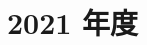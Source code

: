 \documentclass[../../hsm_tok_a.tex]{subfiles}
\begin{document}
    \section{2021 年度}

    

    \clearpage

    
\end{document}
